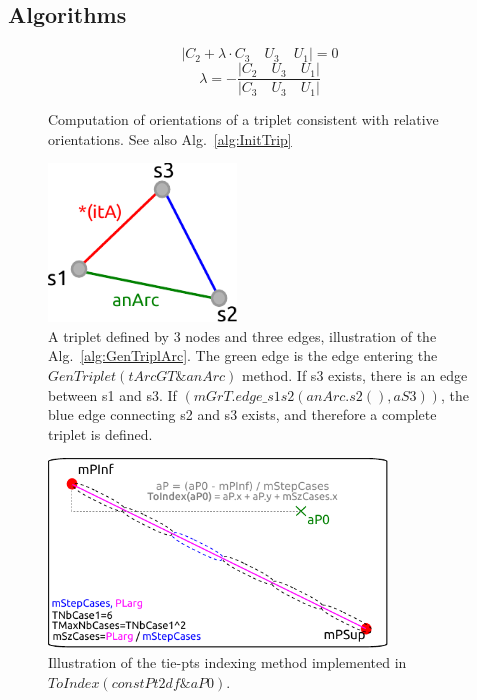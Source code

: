 \subsection{Algorithms}

\begin{figure}[H]
\begin{equation}
| C_{2} + \lambda \cdot C_{3} \quad U_{3} \quad U_1 | = 0
\end{equation}\label{eq:coplan}
\begin{equation}
\lambda = -\frac{| C_{2} \quad U_{3} \quad U_1 |}{| C_{3} \quad U_{3} \quad U_1 |}
\end{equation}\label{eq:lambda}
\caption{Computation of orientations of a triplet consistent with relative orientations. See also Alg.~\ref{alg:InitTrip}}
\end{figure}
 

\begin{figure}[H]
\centering
\includegraphics[width=5cm]{img/triplet.pdf}\caption{A triplet defined by 3 nodes and three edges, illustration of the Alg.~\ref{alg:GenTriplArc}. The green edge is the edge entering the $GenTriplet(tArcGT \& anArc)$ method. If s3 exists, there is an edge between s1 and s3. If $(mGrT.edge\_s1s2(anArc.s2(),aS3))$, the blue edge connecting s2 and s3 exists, and therefore a complete triplet is defined.
}\label{fig:triplet}
\end{figure}

\begin{figure}[H]
\centering
\includegraphics[width=9cm]{img/ToIndex.pdf}\caption{Illustration of the tie-pts indexing method implemented in $ToIndex(const Pt2df \&  aP0)$.}
\end{figure}\label{fig:ToIndex}

